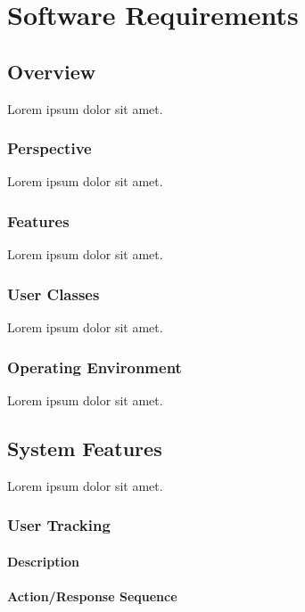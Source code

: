 \chapter{Software Requirements}
\label{chap:software_requirements}

\section{Overview}

Lorem ipsum dolor sit amet.

\subsection{Perspective}

Lorem ipsum dolor sit amet.

\subsection{Features}

Lorem ipsum dolor sit amet.

\subsection{User Classes}

Lorem ipsum dolor sit amet.

\subsection{Operating Environment}

Lorem ipsum dolor sit amet.

\section{System Features}

Lorem ipsum dolor sit amet.

\subsection{User Tracking}

\subsubsection{Description}

\subsubsection{Action/Response Sequence}


